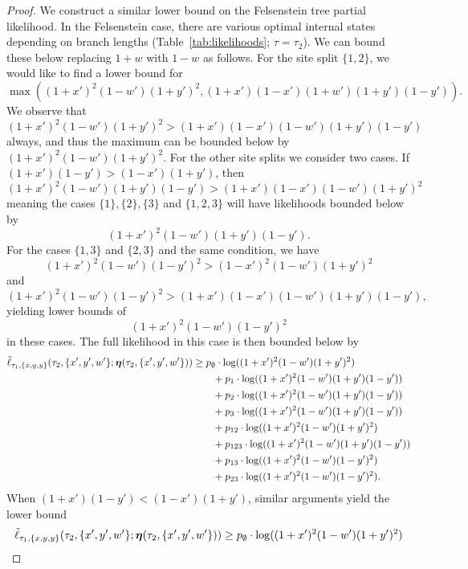 \begin{proof}
We construct a similar lower bound on the Felsenstein tree partial likelihood.
In the Felsenstein case, there are various optimal internal states depending on branch lengths (Table~\ref{tab:likelihoods}; $\tau = \tau_2$).
We can bound these below replacing $1+w$ with $1-w$ as follows.
For the site split $\{1,2\}$, we would like to find a lower bound for
$$
\max\left((1+x')^2 (1-w')(1+y')^2, (1+x')(1-x')(1+w')(1+y')(1-y')\right).
$$
We observe that
$$
(1+x')^2 (1-w')(1+y')^2 > (1+x')(1-x')(1-w')(1+y')(1-y')
$$
always, and thus the maximum can be bounded below by $(1+x')^2 (1-w')(1+y')^2$.
For the other site splits we consider two cases.
If $(1+x')(1-y') > (1-x')(1+y')$, then
$$
(1+x')^2(1-w')(1+y')(1-y') > (1+x')(1-x')(1-w')(1+y')^2
$$
meaning the cases $\{1\}, \{2\}, \{3\}$ and $\{1,2,3\}$ will have likelihoods bounded below by
$$
(1+x')^2(1-w')(1+y')(1-y').
$$
For the cases $\{1,3\}$ and $\{2,3\}$ and the same condition, we have
$$
(1+x')^2(1-w')(1-y')^2 > (1-x')^2(1-w')(1+y')^2
$$
and
$$
(1+x')^2(1-w')(1-y')^2 > (1+x')(1-x')(1-w')(1+y')(1-y'),
$$
yielding lower bounds of
$$
(1+x')^2(1-w')(1-y')^2
$$
in these cases.
The full likelihood in this case is then bounded below by
\begin{align*}
    \tilde{\ell}_{\tau_1,\{x,y,y\}}(\tau_2, \{x',y',w'\}; \boldsymbol\eta(\tau_2,\{x',y',w'\}))
    &\ge      p_{\emptyset}  \cdot\log((1+x')^2   (1-w')(1+y')^2) \\
    &\qquad + p_{1}          \cdot\log((1+x')^2   (1-w')(1+y')(1-y')) \\
    &\qquad + p_{2}          \cdot\log((1+x')^2   (1-w')(1+y')(1-y')) \\
    &\qquad + p_{3}          \cdot\log((1+x')^2   (1-w')(1+y')(1-y')) \\
    &\qquad + p_{12}         \cdot\log((1+x')^2   (1-w')(1+y')^2) \\
    &\qquad + p_{123}        \cdot\log((1+x')^2   (1-w')(1+y')(1-y'))\\
    &\qquad + p_{13}         \cdot\log((1+x')^2   (1-w')(1-y')^2) \\
    &\qquad + p_{23}         \cdot\log((1+x')^2   (1-w')(1-y')^2).
\end{align*}
When $(1+x')(1-y') < (1-x')(1+y')$, similar arguments yield the lower bound
\begin{align*}
    \tilde{\ell}_{\tau_1,\{x,y,y\}}(\tau_2, \{x',y',w'\}; \fullAncestralSplitPartitions(\tau_2,\{x',y',w'\}))
    &\ge      p_{\emptyset}  \cdot\log((1+x')^2    (1-w')(1+y')^2) \\

\end{align*}
\end{proof}
